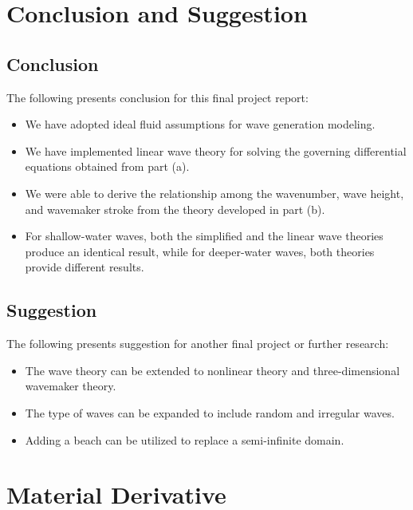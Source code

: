 \documentclass[12pt,a4paper]{report}
\begin{document}
\chapter{Conclusion and Suggestion}

\section{Conclusion}

The following presents conclusion for this final project report:
\begin{itemize}[leftmargin=1.5em]
\item[\textbf{a.}] We have adopted ideal fluid assumptions for wave generation modeling.
\item[\textbf{b.}] We have implemented linear wave theory for solving the governing differential equations obtained from part (a).
\item[\textbf{c.}] We were able to derive the relationship among the wavenumber, wave height, and wavemaker stroke from the theory developed in part (b).
\item[\textbf{d.}] For shallow-water waves, both the simplified and the linear wave theories produce an identical result, while for deeper-water waves, both theories provide different results.
\end{itemize}

\section{Suggestion}

The following presents suggestion for another final project or further research: 
\begin{itemize}[leftmargin=1.5em]
\item[\textbf{a.}] The wave theory can be extended to nonlinear theory and three-dimensional wavemaker theory.
\item[\textbf{b.}] The type of waves can be expanded to include random and irregular waves.
\item[\textbf{c.}] Adding a beach can be utilized to replace a semi-infinite domain.
\end{itemize}

\appendix

\chapter{Material Derivative}
\end{document}
